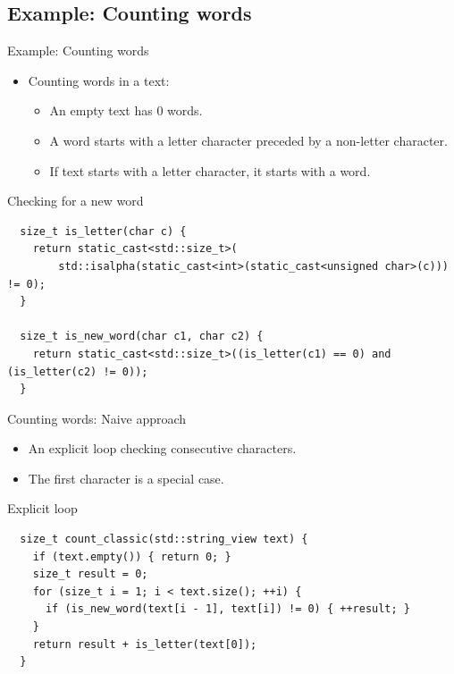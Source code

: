 \subsection{Example: Counting words}

\begin{frame}[t,fragile]{Example: Counting words}
\begin{itemize}
\item Counting words in a text:
    \begin{itemize}
        \item An empty text has 0 words.
        \item A word starts with a letter character preceded by a non-letter character.
        \item If text starts with a letter character, it starts with a word.
    \end{itemize}
\end{itemize}

\begin{block}{Checking for a new word}
\begin{lstlisting}
  size_t is_letter(char c) {
    return static_cast<std::size_t>(
        std::isalpha(static_cast<int>(static_cast<unsigned char>(c))) != 0);
  }

  size_t is_new_word(char c1, char c2) {
    return static_cast<std::size_t>((is_letter(c1) == 0) and (is_letter(c2) != 0));
  }
\end{lstlisting}
\end{block}

\end{frame}

\begin{frame}[t,fragile]{Counting words: Naive approach}
    \begin{itemize}
        \item An explicit loop checking consecutive characters.
        \item The first character is a special case.
    \end{itemize}
\begin{block}{Explicit loop}
\begin{lstlisting}
  size_t count_classic(std::string_view text) {
    if (text.empty()) { return 0; }
    size_t result = 0;
    for (size_t i = 1; i < text.size(); ++i) {
      if (is_new_word(text[i - 1], text[i]) != 0) { ++result; }
    }
    return result + is_letter(text[0]);
  }
\end{lstlisting}
\end{block}
\end{frame}


